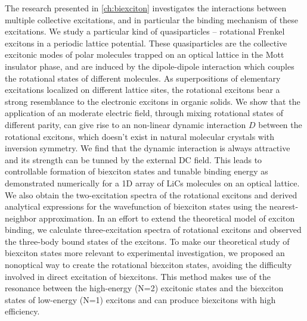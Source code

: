 The research presented in \autoref{ch:biexciton} investigates the interactions between multiple collective excitations, and
in particular the binding mechanism of these excitations. 
We study a particular kind of quasiparticles -- rotational Frenkel excitons in a 
periodic lattice potential. These quasiparticles are the collective excitonic modes of polar molecules 
trapped on an optical lattice in the Mott insulator phase, and are induced by the dipole-dipole interaction which couples the 
rotational states of different molecules. As superpositions of elementary excitations localized on different
 lattice sites, the rotational excitons  bear a strong resemblance to the electronic excitons in organic solids\cite{agranovich}.
We show that the application of an moderate electric field,  through mixing rotational states of different parity, can give 
rise to an non-linear dynamic interaction $D$ between the rotational excitons, which doesn't exist in 
natural molecular crystals with inversion symmetry. We find that the dynamic interaction is always attractive and its 
strength can be tunned by the external DC field. This leads to controllable formation of biexciton states and tunable binding
energy as demonstrated numerically for a 1D array of LiCs molecules on an optical lattice. We also obtain the 
two-excitation spectra of the rotational excitons and derived analytical expressions for the wavefunction of biexciton states 
using the nearest-neighbor approximation. In an effort to extend the theoretical model of exciton binding, we calculate 
three-excitation spectra of rotational excitons and observed the three-body bound states of the excitons.
To make our theoretical study of biexciton states more relevant to experimental investigation, we proposed an nonoptical way to create the rotational biexciton states, avoiding the difficulty involved in 
direct excitation of biexcitons. This method makes use of the resonance between the high-energy (N=2) excitonic states 
and the biexciton states of low-energy (N=1) excitons and can produce biexcitons with high efficiency. 

